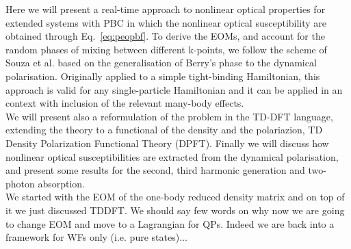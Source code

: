 Here we will present a real-time \ai approach to nonlinear optical properties for extended systems with PBC in which the nonlinear optical susceptibility are obtained through Eq.~\eqref{eq:peopbf}. To derive the EOMs, and account for the random phases of mixing between different k-points, we follow the scheme of Souza et al.\cite{souza_prb} based on the generalisation of Berry's phase to the dynamical polarisation. Originally applied to a simple tight-binding Hamiltonian, this approach is valid for any single-particle Hamiltonian and it can be applied in an \ai context with inclusion of the relevant many-body effects.\\
We will present also a reformulation of the problem in the TD-DFT language, extending the theory to a functional of the density and the polariazion, TD Density Polarization Functional Theory (DPFT). 
Finally we will discuss how nonlinear optical susceptibilities are extracted from the dynamical polarisation, and present some results for the second, third harmonic generation and two-photon absorption. \\
{\color{red} We started with the EOM of the one-body reduced density matrix and on top of it we just discussed TDDFT. We should say few words on why now we are going to change EOM and move to a Lagrangian for QPs. Indeed we are back into a framework for WFs only (i.e. pure states)...}
   



